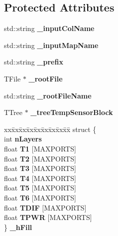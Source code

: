 \subsection*{Protected Attributes}
\begin{DoxyCompactItemize}
\item 
std\-::string {\bfseries \-\_\-input\-Col\-Name}\label{classCALICE_1_1TempRootTreeGenerator_a08f763e65ab9a64986e987af8ce0117c}

\item 
std\-::string {\bfseries \-\_\-input\-Map\-Name}\label{classCALICE_1_1TempRootTreeGenerator_a5f2a177592ddd414347d76de100dc788}

\item 
std\-::string {\bfseries \-\_\-prefix}\label{classCALICE_1_1TempRootTreeGenerator_a324bde76149073163629a7e9e50c453e}

\item 
T\-File $\ast$ {\bfseries \-\_\-root\-File}\label{classCALICE_1_1TempRootTreeGenerator_add462b67e83bd77baed72038875a81a6}

\item 
std\-::string {\bfseries \-\_\-root\-File\-Name}\label{classCALICE_1_1TempRootTreeGenerator_a0c8aec17e8952dd62d3bfa678ce3eca3}

\item 
T\-Tree $\ast$ {\bfseries \-\_\-tree\-Temp\-Sensor\-Block}\label{classCALICE_1_1TempRootTreeGenerator_a40cc9d843dbba86306d56dbee9218c79}

\item 
\begin{tabbing}
xx\=xx\=xx\=xx\=xx\=xx\=xx\=xx\=xx\=\kill
struct \{\\
\>int {\bfseries nLayers}\\
\>float {\bfseries T1} [MAXPORTS]\\
\>float {\bfseries T2} [MAXPORTS]\\
\>float {\bfseries T3} [MAXPORTS]\\
\>float {\bfseries T4} [MAXPORTS]\\
\>float {\bfseries T5} [MAXPORTS]\\
\>float {\bfseries T6} [MAXPORTS]\\
\>float {\bfseries TDIF} [MAXPORTS]\\
\>float {\bfseries TPWR} [MAXPORTS]\\
\} {\bfseries \_hFill}\label{classCALICE_1_1TempRootTreeGenerator_a48b1a2d44f5fb9c335dbfd88b743ced1}
\\

\end{tabbing}\end{DoxyCompactItemize}
